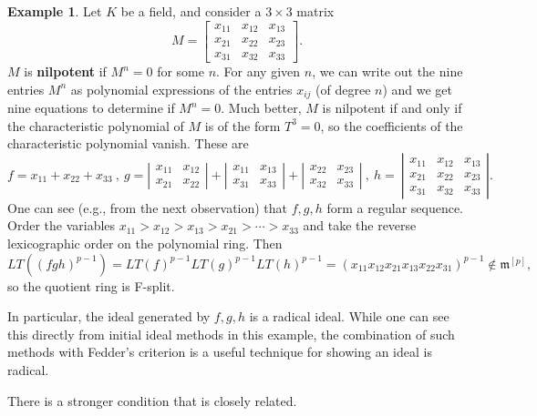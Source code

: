 \documentclass[12pt]{amsart}
\theoremstyle{definition}
\newtheorem{example}[theorem]{Example}
\numberwithin{equation}{theorem}
\def\frakm{\mathfrak{m}}
\begin{document}
\begin{example} Let $K$ be a field, and consider a $3\times 3$ matrix
\[ M = \begin{bmatrix} x_{11} & x_{12} & x_{13} \\  x_{21} & x_{22} & x_{23} \\  x_{31} & x_{32} & x_{33} \end{bmatrix}.\]
$M$ is \textbf{nilpotent} if $M^n=0$ for some $n$. For any given $n$, we can write out the nine entries $M^n$ as polynomial expressions of the entries $x_{ij}$ (of degree $n$) and we get nine equations to determine if $M^n=0$. Much better,  $M$ is nilpotent if and only if the characteristic polynomial of $M$ is of the form $T^3=0$, so the coefficients of the characteristic polynomial vanish. These are
\[ f= x_{11} + x_{22} + x_{33}\ , \ g= \left| \begin{matrix} x_{11} & x_{12} \\   x_{21} & x_{22} \end{matrix} \right| + \left| \begin{matrix} x_{11} & x_{13} \\   x_{31} & x_{33} \end{matrix} \right| + \left| \begin{matrix} x_{22} & x_{23} \\   x_{32} & x_{33} \end{matrix} \right| \ , \ h= \ \left|\begin{matrix} x_{11} & x_{12} & x_{13} \\  x_{21} & x_{22} & x_{23} \\  x_{31} & x_{32} & x_{33} \end{matrix} \right|.\]
One can see (e.g., from the next observation) that $f,g,h$ form a regular sequence.
Order the variables $x_{11} > x_{12} > x_{13} > x_{21} > \cdots > x_{33}$ and take the reverse lexicographic order on the polynomial ring. Then \[ LT((fgh)^{p-1}) = LT(f)^{p-1} LT(g)^{p-1} LT(h)^{p-1} = (x_{11} x_{12} x_{21} x_{13} x_{22} x_{31})^{p-1} \notin \frakm^{[p]},\] so the quotient ring is F-split. 

In particular, the ideal generated by $f,g,h$ is a radical ideal. While one can see this directly from initial ideal methods in this example, the combination of such methods with Fedder's criterion is a useful technique for showing an ideal is radical.
\end{example}



There is a stronger condition that is closely related.
\end{document}
